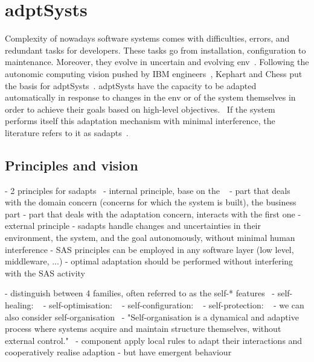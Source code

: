 \section[Adaptive systems]{\Glspl{adptSyst}}
\label{sec:back:adapt-syst}

Complexity of nowadays software systems comes with difficulties, errors, and redundant tasks for developers.
These tasks go from installation, configuration to maintenance.
Moreover, they evolve in uncertain and evolving \gls{env}~\cite{DBLP:conf/dagstuhl/EsfahaniM10}.
Following the autonomic computing vision pushed by IBM engineers~\cite{computing2006architectural}, Kephart and Chess put the basis for \glspl{adptSyst}~\cite{DBLP:journals/computer/KephartC03}.
\Glspl{adptSyst} have the capacity to be adapted automatically in response to changes in the \gls{env} or of the system themselves in order to achieve their goals based on high-level objectives.~\cite{DBLP:conf/dagstuhl/ChengLGIMABBBCSDFGGGKKKLMMMPSTTWW09}
If the system performs itself this adaptation mechanism with minimal interference, the literature refers to it as \glspl{sadapt}~\cite{DBLP:conf/dagstuhl/BrunSGGKLMPS09}.

\subsection{Principles and vision}

- 2 principles for \glspl{sadapt}~\cite{DBLP:books/sp/19/Weyns19}
	- internal principle, base on the ~\cite{DBLP:conf/icse/AnderssonLMW09}
		- part that deals with the domain concern (concerns for which the system is built), the business part
		- part that deals with the adaptation concern, interacts with the first one
	- external principle
		- \glspl{sadapt} handle changes and uncertainties in their environment, the system, and the goal autonomously, without minimal human interference	
- SAS principles can be employed in any software layer (low level, middleware, ...)
- optimal adaptation should be performed without interfering with the SAS activity~\cite{DBLP:journals/tse/KramerM90}

- distinguish between 4 families, often referred to as the self-* features~\cite{computing2006architectural}
	- self-healing: ~\cite{computing2006architectural}
	- self-optimisation: ~\cite{computing2006architectural}
	- self-configuration: ~\cite{computing2006architectural}
	- self-protection: ~\cite{computing2006architectural}
- we can also consider self-organisation~\cite{dempster1998self}
	- "Self-organisation is a dynamical and adaptive process where systems acquire and maintain structure themselves, without external control."~\cite{DBLP:conf/atal/WolfH04}
	- component apply local rules to adapt their interactions and cooperatively realise adaption
	- but have emergent behaviour
	
